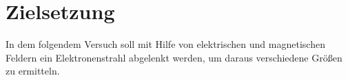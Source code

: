 \section{Zielsetzung}

\label{sec:Zielsetzung}

In dem folgendem Versuch soll mit Hilfe von elektrischen und magnetischen Feldern ein Elektronenstrahl
abgelenkt werden, um daraus verschiedene Größen zu ermitteln. 
